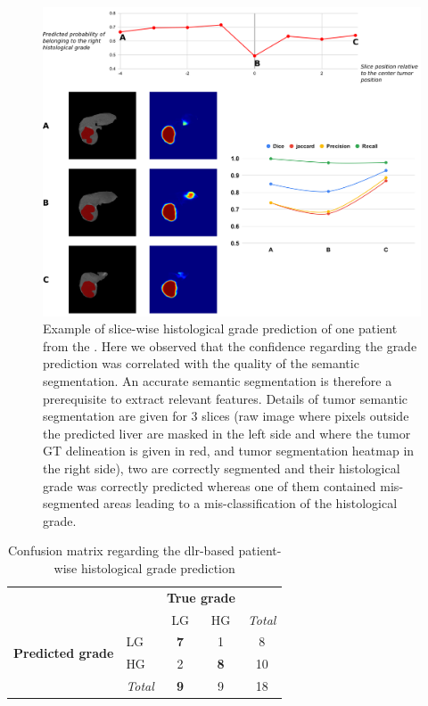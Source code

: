 \begin{figure}[th!]
	\centering
	\includegraphics[width=0.9\linewidth]{../HistologicalGradePrediction/images/Slice_hist_grad_prediction_details_v2}
	\caption{Example of slice-wise histological grade prediction of one patient from the . Here we observed that the confidence regarding the grade prediction was correlated with the quality of the semantic segmentation. An accurate semantic segmentation is therefore a prerequisite to extract relevant features. Details of tumor semantic segmentation are given for 3 slices (raw image where pixels outside the predicted liver are masked in the left side and where the tumor GT delineation is given in red, and tumor segmentation heatmap in the right side), two are correctly segmented and their histological grade was correctly predicted whereas one of them contained mis-segmented areas leading to a mis-classification of the histological grade.}
	\label{fig:Slice_hist_grad_prediction_details}
\end{figure}

\renewcommand{\arraystretch}{2}
\begin{table}[!ht]
	\centering
	\caption{Confusion matrix regarding the \ac{dlr}-based patient-wise histological grade prediction}\label{tab:confusion_matrix}
	\begin{tabular}{l|l|c|c|c}
		\multicolumn{2}{c}{}&\multicolumn{2}{c}{\textbf{True grade}}&\\
		\cline{3-4}
		\multicolumn{2}{c|}{}&LG&HG&\multicolumn{1}{c}{\textit{Total}}\\
		\cline{2-4}
		\multirow{2}{*}{\textbf{Predicted grade}}& LG & \textbf{7} & 1 & 8\\
		\cline{2-4}
		& HG & 2 & \textbf{8} & 10 \\
		\cline{2-4}
		\multicolumn{1}{c}{} & \multicolumn{1}{c}{\textit{Total}} & \multicolumn{1}{c}{\textbf{9}} & \multicolumn{1}{c}{9} & \multicolumn{1}{c}{18}\\
	\end{tabular}
\end{table}
\renewcommand{\arraystretch}{5}

